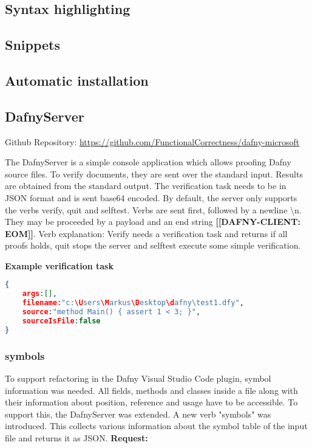 \subsection{Syntax highlighting}

\subsection{Snippets}

\subsection{Automatic installation}


\subsection{DafnyServer}
Github Repository: \href{https://github.com/FunctionalCorrectness/dafny-microsoft}{https://github.com/FunctionalCorrectness/dafny-microsoft}

The DafnyServer is a simple console application which allows proofing Dafny source files. To verify documents, they are sent over the standard input. Results are obtained from the standard output. The verification task needs to be in JSON format  and is sent base64 encoded. By default, the server only supports the verbs verify, quit and selftest. Verbs are sent first, followed by a newline \textbackslash{n}. They may be proceeded by a payload and an end string \textbf{[[DAFNY-CLIENT: EOM]]}. \newline 
Verb explanation: Verify needs a verification task and returns if all proofs holds, quit stops the server and selftest execute some simple verification. \newline

\textbf{Example verification task}
\begin{lstlisting}[language=json,firstnumber=1]
{
	args:[],
	filename:"c:\Users\Markus\Desktop\dafny\test1.dfy",
	source:"method Main() {	assert 1 < 3; }",
	sourceIsFile:false
}

\end{lstlisting}

\subsubsection{symbols}
To support refactoring in the Dafny Visual Studio Code plugin, symbol information was needed. All fields, methods and classes inside a file along with their information about position, reference and usage have to be accessible. To support this, the DafnyServer was extended. A new verb "symbols" was introduced. This collects various information about the symbol table of the input file and returns it as JSON. 
\newline\newline
\textbf{Request: }

